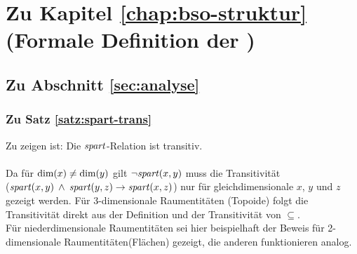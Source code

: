 \section{Zu Kapitel \ref{chap:bso-struktur} (Formale Definition der \strukt)}


\subsection{Zu Abschnitt \ref{sec:analyse}}

\subsubsection{Zu Satz \ref{satz:spart-trans}}\label{anh:spart-trans}
Zu zeigen ist: Die $\mathit{spart}$-Relation ist transitiv.\\ \ \\
%
Da für $\text{dim}(x) \neq \text{dim}(y)$ gilt $\neg \mathit{spart}(x,y)$ muss die Transitivität\\
($\mathit{spart}(x,y) \:\land\: \mathit{spart}(y,z) \to \mathit{spart}(x,z)$) nur für gleichdimensionale $x$, $y$ und $z$ gezeigt werden.
Für 3-dimensionale Raumentitäten (Topoide) folgt die Transitivität direkt aus der Definition und der Transitivität von \glqq $\subseteq$\grqq .\\
Für niederdimensionale Raumentitäten sei hier beispielhaft der Beweis für 2-dimensionale Raumentitäten(Flächen) gezeigt, die anderen funktionieren analog. \\ \ \\
%
